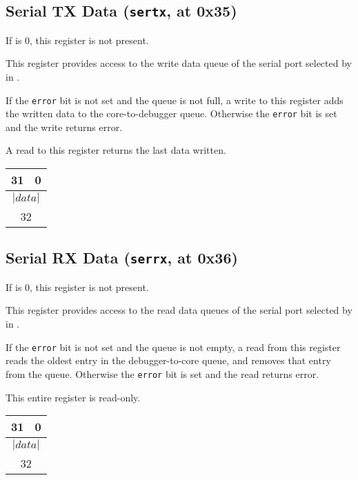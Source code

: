 \subsection{Serial TX Data ({\tt sertx}, at 0x35)}
\label{sertx}
If \Fserialcount is 0, this register is not present.

        This register provides access to the write data queue of the serial port
        selected by \Fserial in \Rsercs.

        If the {\tt error} bit is not set and the queue is not full, a write to this register
        adds the written data to the core-to-debugger queue.
        Otherwise the {\tt error} bit is set and the write returns error.

        A read to this register returns the last data written.

\begin{center}
\begin{tabular}{p{21.3 ex}p{10.7 ex}}
{\scriptsize 31} &
\multicolumn{1}{r}{\scriptsize 0}
\\
         \hline
\multicolumn{2}{|c|}{$|data|$}
\\
         \hline
\multicolumn{2}{c}{\scriptsize 32}
\\
   \end{tabular}
\end{center}

\subsection{Serial RX Data ({\tt serrx}, at 0x36)}
\label{serrx}
If \Fserialcount is 0, this register is not present.

        This register provides access to the read data queues of the serial port
        selected by \Fserial in \Rsercs.

        If the {\tt error} bit is not set and the queue is not empty, a read from this register reads the
        oldest entry in the debugger-to-core queue, and removes that entry from the queue.
        Otherwise the {\tt error} bit is set and the read returns error.

This entire register is read-only.
\begin{center}
\begin{tabular}{p{21.3 ex}p{10.7 ex}}
{\scriptsize 31} &
\multicolumn{1}{r}{\scriptsize 0}
\\
         \hline
\multicolumn{2}{|c|}{$|data|$}
\\
         \hline
\multicolumn{2}{c}{\scriptsize 32}
\\
   \end{tabular}
\end{center}

